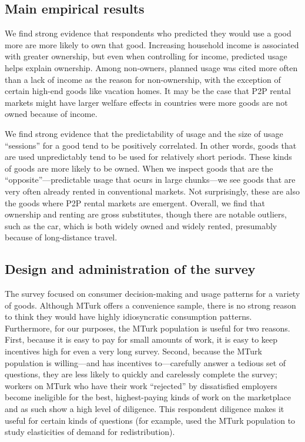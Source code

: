 \documentclass[11pt]{article}
\begin{document}
\subsection{Main empirical results}
We find strong evidence that respondents who predicted they would use a good more are more likely to own that good.
Increasing household income is associated with greater ownership, but even when controlling for income, predicted usage helps explain ownership. 
Among non-owners, planned usage was cited more often than a lack of income as the reason for non-ownership, with the exception of certain high-end goods like vacation homes.
It may be the case that P2P rental markets might have larger welfare effects in countries were more goods are not owned because of income.

We find strong evidence that the predictability of usage and the size of usage ``sessions'' for a good tend to be positively correlated.
In other words, goods that are used unpredictably tend to be used for relatively short periods.
These kinds of goods are more likely to be owned. 
When we inspect goods that are the ``opposite''---predictable usage that ocurs in large chunks---we see goods that are very often already rented in conventional markets.
Not surprisingly, these are also the goods where P2P rental markets are emergent.
Overall, we find that ownership and renting are gross substitutes, though there are notable outliers, such as the car, which is both widely owned and widely rented, presumably because of long-distance travel. 

\subsection{Design and administration of the survey}
The survey focused on consumer decision-making and usage patterns for a variety of goods. 
Although MTurk offers a convenience sample, there is no strong reason to think they would have highly idiosyncratic consumption patterns. 
Furthermore, for our purposes, the MTurk population is useful for two reasons. 
First, because it is easy to pay for small amounts of work, it is easy to keep incentives high for even a very long survey. 
Second, because the MTurk population is willing---and has incentives to---carefully answer a tedious set of questions, they are less likely to quickly and carelessly complete the survey; 
workers on MTurk who have their work ``rejected'' by dissatisfied employers become ineligible for the best, highest-paying kinds of work on the marketplace and as such show a high level of diligence.    
This respondent diligence makes it useful for certain kinds of questions (for example, \cite{kuziemko2013elastic} used the MTurk population to study elasticities of demand for redistribution).  
\end{document}

